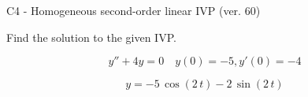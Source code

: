 \begin{exercise}
  \begin{exerciseTitle}C4 - Homogeneous second-order linear IVP (ver. 60)\end{exerciseTitle}
  \begin{exerciseStatement}
    
Find the solution to the given IVP.

    
\[y''+4y = 0 \hspace{1em} y(0) = -5 , y'(0) = -4\]

  \end{exerciseStatement}
  \begin{exerciseAnswer}
    
\[y= -5 \, \cos\left(2 \, t\right) - 2 \, \sin\left(2 \, t\right)\]

  \end{exerciseAnswer}
\end{exercise}